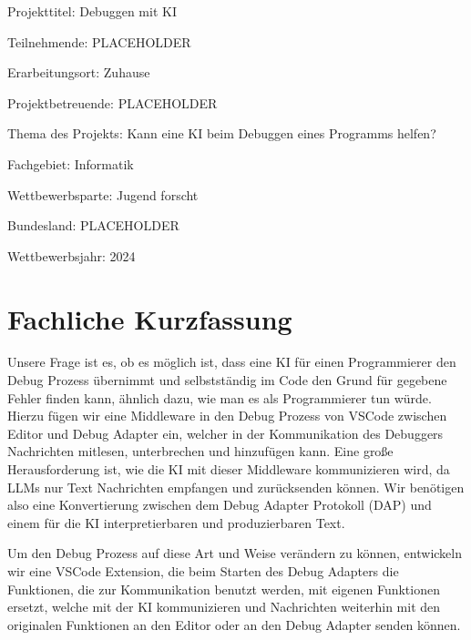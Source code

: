 \documentclass[a4paper,12pt,ngerman]{scrartcl}
\begin{document}
\begin{titlepage}
	Projekttitel: Debuggen mit KI
	\vspace{1cm}
	
	Teilnehmende: PLACEHOLDER
	
	Erarbeitungsort: Zuhause
	
	Projektbetreuende: PLACEHOLDER
	
	Thema des Projekts: Kann eine KI beim Debuggen eines Programms helfen?
	
	Fachgebiet: Informatik
	
	Wettbewerbsparte: Jugend forscht
	
	Bundesland: PLACEHOLDER
	
	Wettbewerbsjahr: 2024
	
	\vspace{2cm}
	\vfill
\end{titlepage}
\clearpage
\tableofcontents
\clearpage

\section{Fachliche Kurzfassung}

Unsere Frage ist es, ob es möglich ist, dass eine KI für einen Programmierer den Debug Prozess übernimmt und selbstständig im Code den Grund für gegebene Fehler finden kann, ähnlich dazu, wie man es als Programmierer tun würde. Hierzu fügen wir eine Middleware in den Debug Prozess von VSCode zwischen Editor und Debug Adapter ein, welcher in der Kommunikation des Debuggers Nachrichten mitlesen, unterbrechen und hinzufügen kann. Eine große Herausforderung ist, wie die KI mit dieser Middleware kommunizieren wird, da LLMs nur Text Nachrichten empfangen und zurücksenden können. Wir benötigen also eine Konvertierung zwischen dem Debug Adapter Protokoll (DAP) und einem für die KI interpretierbaren und produzierbaren Text.

Um den Debug Prozess auf diese Art und Weise verändern zu können, entwickeln wir eine VSCode Extension, die beim Starten des Debug Adapters die Funktionen, die zur Kommunikation benutzt werden, mit eigenen Funktionen ersetzt, welche mit der KI kommunizieren und Nachrichten weiterhin mit den originalen Funktionen an den Editor oder an den Debug Adapter senden können.
\end{document}

